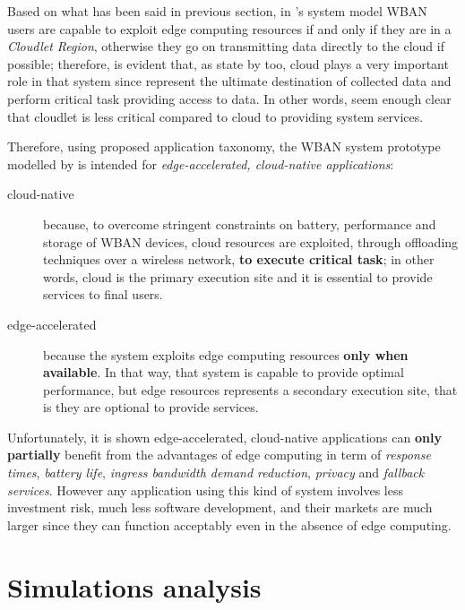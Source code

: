 \documentclass[sigchi]{acmart}
\begin{document}
\vspace{0.3cm}

Based on what has been said in previous section, in \citet{MSAReport}'s system model WBAN users are capable to exploit edge computing resources if and only if they are in a \textit{Cloudlet Region}, otherwise they go on transmitting data directly to the cloud if possible; therefore, is evident that, as state by \citet{MSAReport} too, cloud plays a very important role in that system since represent the ultimate destination of collected data and perform critical task providing access to data. In other words, seem enough clear that cloudlet is less critical compared to cloud to providing system services.

Therefore, using \citet{EdgeNativeApplications} proposed application taxonomy, the WBAN system prototype modelled by \citet{MSAReport} is intended for \textit{edge-accelerated, cloud-native applications}:

\begin{description}

\item[cloud-native] because, to overcome stringent constraints on battery, performance and storage of WBAN devices, cloud resources are exploited, through offloading techniques over a wireless network, \textbf{to execute critical task}; in other words, cloud is the primary execution site and it is essential to provide services to final users.

\item[edge-accelerated] because the system exploits edge computing resources \textbf{only when available}. In that way, that system is capable to provide optimal performance, but edge resources represents a secondary execution site, that is they are optional to provide services.

\end{description}

Unfortunately, it is shown edge-accelerated, cloud-native applications can \textbf{only partially} benefit from the advantages of edge computing in term of \textit{response times}, \textit{battery life}, \textit{ingress bandwidth demand reduction}, \textit{privacy} and \textit{fallback services}. However any application using this kind of system involves less investment risk, much less software development, and their markets are much larger since they can function acceptably even in the absence of edge computing.

\section{Simulations analysis}
\end{document}
